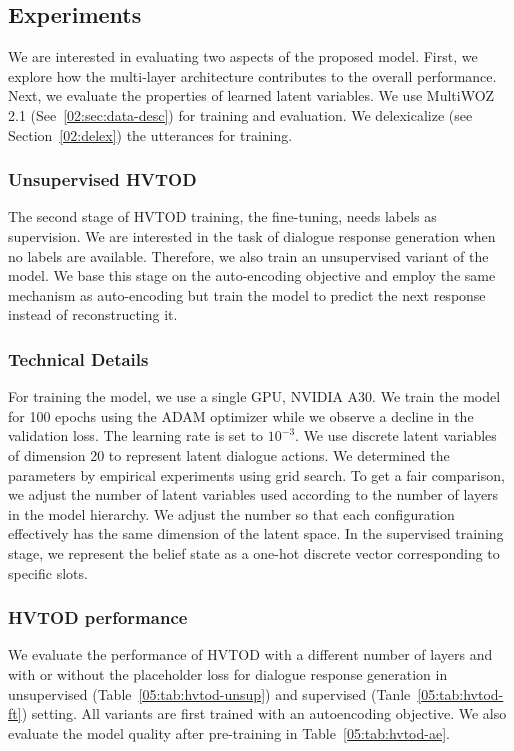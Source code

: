 \subsection{Experiments}
We are interested in evaluating two aspects of the proposed model.
First, we explore how the multi-layer architecture contributes to the overall performance.
Next, we evaluate the properties of learned latent variables.
We use MultiWOZ 2.1 (See~\ref{02:sec:data-desc}) for training and evaluation.
We delexicalize (see Section~\ref{02:delex}) the utterances for training.

\subsubsection{Unsupervised HVTOD}
The second stage of HVTOD training, the fine-tuning, needs labels as supervision.
We are interested in the task of dialogue response generation when no labels are available.
Therefore, we also train an unsupervised variant of the model.
We base this stage on the auto-encoding objective and employ the same mechanism as auto-encoding but train the model to predict the next response instead of reconstructing it.

\subsubsection{Technical Details}
For training the model, we use a single GPU, NVIDIA A30.
We train the model for 100 epochs using the ADAM optimizer while we observe a decline in the validation loss.
The learning rate is set to $10^{-3}$.
We use discrete latent variables of dimension 20 to represent latent dialogue actions.
We determined the parameters by empirical experiments using grid search.
To get a fair comparison, we adjust the number of latent variables used according to the number of layers in the model hierarchy.
We adjust the number so that each configuration effectively has the same dimension of the latent space.
In the supervised training stage, we represent the belief state as a one-hot discrete vector corresponding to specific slots.

\subsubsection{HVTOD performance}
We evaluate the performance of HVTOD with a different number of layers and with or without the placeholder loss for dialogue response generation in unsupervised (Table~\ref{05:tab:hvtod-unsup}) and supervised (Tanle~\ref{05:tab:hvtod-ft}) setting.
All variants are first trained with an autoencoding objective.
We also evaluate the model quality after pre-training in Table~\ref{05:tab:hvtod-ae}.


